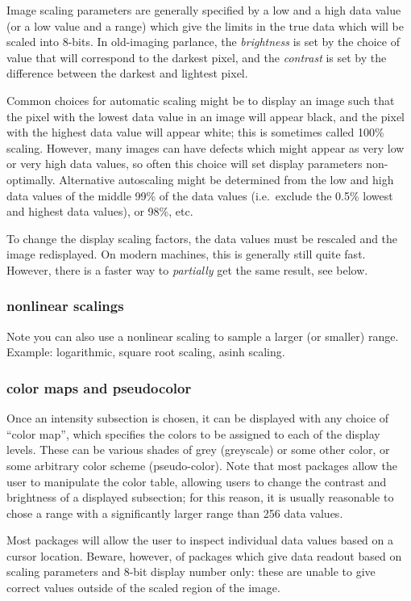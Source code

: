 \documentclass{article}
\begin{document}
Image scaling parameters are generally specified by a low and a high
data value (or a low value and a range) which give the limits in the
true data which will be scaled into 8-bits. In old-imaging parlance,
the \emph{brightness} is set by the choice of value that will correspond to
the darkest pixel, and the \emph{contrast} is set by the difference between
the darkest and lightest pixel.

Common choices for automatic scaling might be to display an image such
that the pixel with the lowest data value in an image will appear
black, and the pixel with the highest data value will appear white;
this is sometimes called 100\% scaling. However, many images can have
defects which might appear as very low or very high data values, so
often this choice will set display parameters non-optimally.
Alternative autoscaling might be determined from the low and high data
values of the middle 99\% of the data values (i.e.\ exclude the 0.5\%
lowest and highest data values), or 98\%, etc.

To change the display scaling factors, the data values must be
rescaled and the image redisplayed. On modern machines, this is
generally still quite fast. However, there is a faster way to
\emph{partially} get the same result, see below.


\subsubsection*{nonlinear scalings}
Note you can also use a nonlinear scaling to sample a larger (or
smaller) range. Example: logarithmic, square root scaling, asinh
scaling.

\subsubsection*{color maps and pseudocolor}
Once an intensity subsection is chosen, it can be displayed with any
choice of ``color map'', which specifies the colors to be assigned to
each of the display levels. These can be various shades of grey
(greyscale) or some other color, or some arbitrary color scheme
(pseudo-color). Note that most packages allow the user to manipulate
the color table, allowing users to change the contrast and brightness
of a displayed subsection; for this reason, it is usually reasonable
to chose a range with a significantly larger range than 256 data
values.

Most packages will allow the user to inspect individual data values
based on a cursor location. Beware, however, of packages which give
data readout based on scaling parameters and 8-bit display number
only: these are unable to give correct values outside of the scaled
region of the image.
\end{document}
